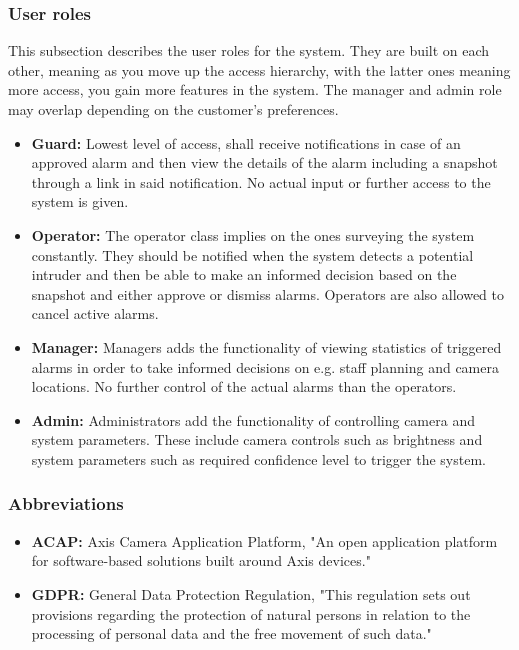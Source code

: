 \documentclass{article}
\begin{document}
\subsubsection{User roles}
This subsection describes the user roles for the system. They are built on each other, meaning as you move up the access hierarchy, with the latter ones meaning more access, you gain more features in the system. The manager and admin role may overlap depending on the customer's preferences.
 \begin{itemize}
    \item 
    \textbf{Guard:} Lowest level of access, shall receive notifications in case of an approved alarm and then view the details of the alarm including a snapshot through a link in said notification. No actual input or further access to the system is given.
    \item 
    \textbf{Operator:} The operator class implies on the ones surveying the system constantly. They should be notified when the system detects a potential intruder and then be able to make an informed decision based on the snapshot and either approve or dismiss alarms. Operators are also allowed to cancel active alarms.

    \item \textbf{Manager:} Managers adds the functionality of viewing statistics of triggered alarms in order to take informed decisions on e.g. staff planning and camera locations. No further control of the actual alarms than the operators.

     \item 
    \textbf{Admin:} Administrators add the functionality of controlling camera and system parameters. These include camera controls such as brightness and system parameters such as required confidence level to trigger the system.

\end{itemize}

\subsubsection{Abbreviations}

\begin{itemize}
   \item \textbf{ACAP:} Axis Camera Application Platform, "An open application platform for software-based solutions built around Axis devices." \cite{ACAP}
     \item \textbf{GDPR:} General Data Protection Regulation,
"This regulation sets out provisions regarding the protection of natural persons in relation to the processing of personal data and the free movement of such data." \cite{GDPR}
\end{itemize}
\end{document}
